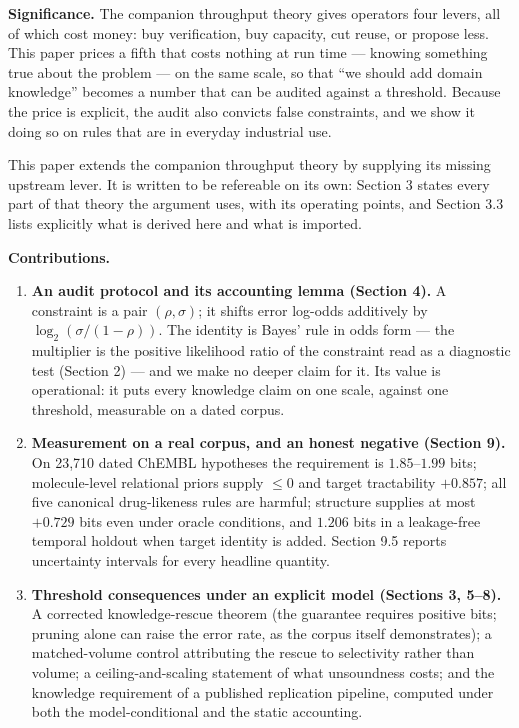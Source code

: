 \documentclass[11pt]{article}
\begin{document}
\textbf{Significance.} The companion throughput theory \cite{ghosh-throughput}
gives operators four levers, all of which cost money: buy verification, buy
capacity, cut reuse, or propose less. This paper prices a fifth that costs
nothing at run time --- knowing something true about the problem --- on the
same scale, so that ``we should add domain knowledge'' becomes a number that
can be audited against a threshold. Because the price is explicit, the audit
also convicts false constraints, and we show it doing so on rules that are in
everyday industrial use.

This paper extends the companion throughput theory
\cite{ghosh-throughput} by supplying its missing upstream lever. It is
written to be refereable on its own: Section 3 states every part of that
theory the argument uses, with its operating points, and Section 3.3 lists
explicitly what is derived here and what is imported.

\textbf{Contributions.}

\begin{enumerate}
\item \textbf{An audit protocol and its accounting lemma (Section 4).} A
constraint is a pair $(\rho, \sigma)$; it shifts error log-odds additively by
$\log_2(\sigma/(1-\rho))$. The identity is Bayes' rule in odds form --- the
multiplier is the positive likelihood ratio of the constraint read as a
diagnostic test (Section 2) --- and we make no deeper claim for it. Its value
is operational: it puts every knowledge claim on one scale, against one
threshold, measurable on a dated corpus.
\item \textbf{Measurement on a real corpus, and an honest negative
(Section 9).} On 23{,}710 dated ChEMBL hypotheses the requirement is
$1.85$--$1.99$ bits; molecule-level relational priors supply $\leq 0$
and target tractability $+0.857$; all five canonical drug-likeness
rules are harmful; structure supplies at most $+0.729$ bits even under
oracle conditions, and $1.206$ bits in a leakage-free temporal
holdout when target identity is added. Section 9.5 reports uncertainty intervals for every headline
quantity.
\item \textbf{Threshold consequences under an explicit model (Sections 3,
5--8).} A corrected knowledge-rescue theorem (the guarantee requires
positive bits; pruning alone can raise the error rate, as the corpus itself
demonstrates); a matched-volume control attributing the rescue to
selectivity rather than volume; a ceiling-and-scaling statement of what
unsoundness costs; and the knowledge requirement of a published replication
pipeline, computed under both the model-conditional and the static
accounting.
\end{enumerate}
\end{document}
